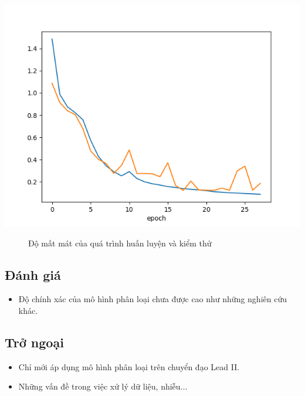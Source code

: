 \begin{center}
    \includegraphics[scale=.6]{image/chapter6/loss.png}
    \begin{figure}[htp]
    \begin{center}
    \end{center}
    \caption{Độ mất mát của quá trình huấn luyện và kiểm thử}
    \end{figure}
\end{center}

\subsection{Đánh giá}
\begin{itemize}
    \item Độ chính xác của mô hình phân loại chưa được cao như những nghiên cứu khác.
\end{itemize}
\subsection{Trở ngoại}
\begin{itemize}
    \item Chỉ mới áp dụng mô hình phân loại trên chuyển đạo Lead II.
    \item Những vấn đề trong việc xử lý dữ liệu, nhiễu...
\end{itemize}
